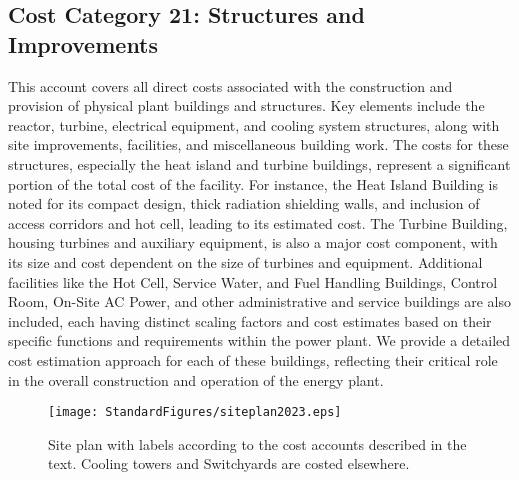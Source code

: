 \subsection{Cost Category 21: Structures and Improvements}

This account covers all direct costs associated with the construction and provision of physical plant buildings and structures. Key elements include the reactor, turbine, electrical equipment, and cooling system structures, along with site improvements, facilities, and miscellaneous building work. The costs for these structures, especially the heat island and turbine buildings, represent a significant portion of the total cost of the facility. For instance, the Heat Island Building is noted for its compact design, thick radiation shielding walls, and inclusion of access corridors and hot cell, leading to its estimated cost. The Turbine Building, housing turbines and auxiliary equipment, is also a major cost component, with its size and cost dependent on the size of turbines and equipment. Additional facilities like the Hot Cell, Service Water, and Fuel Handling Buildings, Control Room, On-Site AC Power, and other administrative and service buildings are also included, each having distinct scaling factors and cost estimates based on their specific functions and requirements within the power plant. We provide a detailed cost estimation approach for each of these buildings, reflecting their critical role in the overall construction and operation of the energy plant.\\

\begin{figure}[h!] 
\centering 
\texttt{[image: StandardFigures/siteplan2023.eps]} 
\caption{Site plan with labels according to the cost accounts described in the text.  Cooling towers and Switchyards are costed elsewhere.} 
\label{fig:site} 
\end{figure} 



